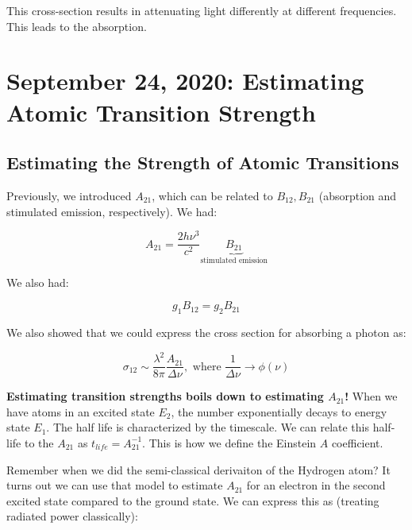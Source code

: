 \documentclass{article}
\begin{document}
This cross-section results in attenuating light differently at different frequencies. This leads to the absorption. 


\newpage
\section{September 24, 2020: Estimating Atomic Transition Strength}

\subsection{Estimating the Strength of Atomic Transitions}

Previously, we introduced $A_{21}$, which can be related to $B_{12}, B_{21}$ (absorption and stimulated emission, respectively). We had:

\begin{equation}
    A_{21} = \frac{2 h \nu^3}{c^2} \underbrace{B_{21}}_{\text{stimulated emission}}
\end{equation}

We also had:

\begin{equation}
    g_1 B_{12} = g_2 B_{21}
\end{equation}

We also showed that we could express the cross section for absorbing  a photon as:

\begin{equation}
    \boxed{\sigma_{12} \sim \frac{\lambda^2}{8\pi} \frac{A_{21}}{\Delta \nu}}, \text{ where } \frac{1}{\Delta \nu} \rightarrow \phi(\nu)
\end{equation}

\textbf{Estimating transition strengths boils down to estimating $A_{21}$!} When we have atoms in an excited state $E_2$, the number exponentially decays to energy state $E_1$. The half life is characterized by the timescale. We can relate this half-life to the $A_{21}$ as $t_{life} = A^{-1}_{21}$. This is how we define the Einstein $A$ coefficient. 

Remember when we did the semi-classical derivaiton of the Hydrogen atom? It turns out we can use that model to estimate $A_{21}$ for an electron in the second excited state compared to the ground state. We can express this as (treating radiated power classically):
\end{document}
